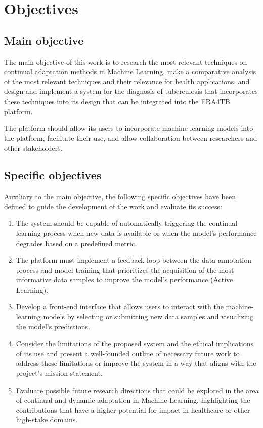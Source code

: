 \documentclass[../main.tex]{subfiles}
\begin{document}
    \section{Objectives} \label{sec:objectives}

    \subsection*{Main objective} \label{sec:main_goal}

    The main objective of this work is to research the most relevant techniques on continual adaptation methods in Machine Learning, make a comparative analysis of the most relevant techniques and their relevance for health applications, and design and implement a system for the diagnosis of tuberculosis that incorporates these techniques into its design that can be integrated into the ERA4TB platform. 
    
    The platform should allow its users to incorporate machine-learning models into the platform, facilitate their use, and allow collaboration between researchers and other stakeholders.

    \subsection*{Specific objectives} \label{sec:specific_objectives}

    Auxiliary to the main objective, the following specific objectives have been defined to guide the development of the work and evaluate its success:

    \begin{enumerate}
        \item The system should be capable of automatically triggering the continual learning process when new data is available or when the model's performance degrades based on a predefined metric.
        \item The platform must implement a feedback loop between the data annotation process and model training that prioritizes the acquisition of the most informative data samples to improve the model's performance (Active Learning).
        \item Develop a front-end interface that allows users to interact with the machine-learning models by selecting or submitting new data samples and visualizing the model's predictions.
        \item Consider the limitations of the proposed system and the ethical implications of its use and present a well-founded outline of necessary future work to address these limitations or improve the system in a way that aligns with the project's mission statement.
        \item Evaluate possible future research directions that could be explored in the area of continual and dynamic adaptation in Machine Learning, highlighting the contributions that have a higher potential for impact in healthcare or other high-stake domains.
    \end{enumerate}
\end{document}
